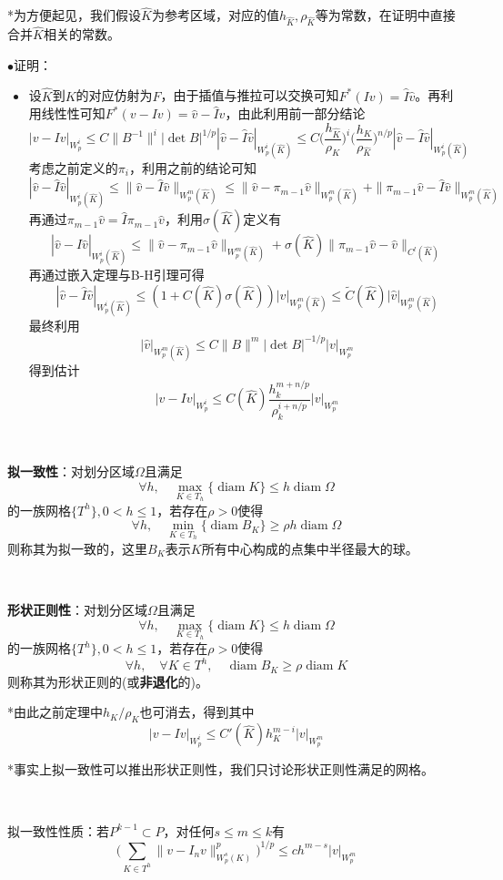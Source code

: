 \documentclass[a4paper,UTF8,fontset=windows]{ctexart}
\DeclareMathOperator*{\diam}{diam}
\newcommand{\proo}[1]{{\kaishu $\bullet$证明：
\begin{itemize}
    \item[] #1
\end{itemize}
}}
\begin{document}
*为方便起见，我们假设$\hat{K}$为参考区域，对应的值$h_{\hat{K}},\rho_{\hat{K}}$等为常数，在证明中直接合并$\hat{K}$相关的常数。

\proo{
    设$\hat{K}$到$K$的对应仿射为$F$，由于插值与推拉可以交换可知$F^*(Iv)=\hat{I}\hat{v}$。再利用线性性可知$F^*(v-Iv)=\hat{v}-\hat{I}\hat{v}$，由此利用前一部分结论
    $$|v-Iv|_{W_p^i}\le C\|B^{-1}\|^i|\det B|^{1/p}|\hat{v}-\hat{I}\hat{v}|_{W_p^i(\hat{K})}\le C\bigg(\frac{h_{\hat{K}}}{\rho_K}\bigg)^i\bigg(\frac{h_K}{\rho_{\hat{K}}}\bigg)^{n/p}|\hat{v}-\hat{I}\hat{v}|_{W_p^i(\hat{K})}$$
    考虑之前定义的$\pi_i$，利用之前的结论可知
    $$|\hat{v}-\hat{I}\hat{v}|_{W_p^i(\hat{K})}\le\|\hat{v}-\hat{I}\hat{v}\|_{W_p^m(\hat{K})}\le\|\hat{v}-\pi_{m-1}\hat{v}\|_{W_p^m(\hat{K})}+\|\pi_{m-1}\hat{v}-\hat{I}\hat{v}\|_{W_p^m(\hat{K})}$$
    再通过$\pi_{m-1}\hat{v}=\hat{I}\pi_{m-1}\hat{v}$，利用$\sigma(\hat{K})$定义有
    $$|\hat{v}-\hat{I}\hat{v}|_{W_p^i(\hat{K})}\le\|\hat{v}-\pi_{m-1}\hat{v}\|_{W_p^m(\hat{K})}+\sigma(\hat{K})\|\pi_{m-1}\hat{v}-\hat{v}\|_{C^l(\hat{K})}$$
    再通过嵌入定理与B-H引理可得
    $$|\hat{v}-\hat{I}\hat{v}|_{W_p^i(\hat{K})}\le(1+C(\hat{K})\sigma(\hat{K}))|\hat{v}|_{W_p^m(\hat{K})}\le\tilde{C}(\hat{K})|\hat{v}|_{W_p^m(\hat{K})}$$
    最终利用
    $$|\hat{v}|_{W_p^m(\hat{K})}\le C\|B\|^m|\det B|^{-1/p}|v|_{W_p^m}$$
    得到估计
    $$|v-Iv|_{W_p^i}\le C(\hat{K})\frac{h_k^{m+n/p}}{\rho_k^{i+n/p}}|v|_{W_p^m}$$
}

\

\textbf{拟一致性}：对划分区域$\Omega$且满足
$$\forall h,\quad\max_{K\in T_h}\{\diam K\}\le h\diam\Omega$$
的一族网格$\{T^h\},0<h\le1$，若存在$\rho>0$使得
$$\forall h,\quad\min_{K\in T_h}\{\diam B_K\}\ge\rho h\diam\Omega$$
则称其为拟一致的，这里$B_K$表示$K$所有中心构成的点集中半径最大的球。

\

\textbf{形状正则性}：对划分区域$\Omega$且满足
$$\forall h,\quad\max_{K\in T_h}\{\diam K\}\le h\diam\Omega$$
的一族网格$\{T^h\},0<h\le1$，若存在$\rho>0$使得
$$\forall h,\quad\forall K\in T^h,\quad\diam B_K\ge\rho\diam K$$
则称其为形状正则的(或\textbf{非退化}的)。


*由此之前定理中$h_K/\rho_K$也可消去，得到其中
$$|v-Iv|_{W_p^i}\le C'(\hat{K})h_K^{m-i}|v|_{W_p^m}$$

*事实上拟一致性可以推出形状正则性，我们只讨论形状正则性满足的网格。

\

拟一致性性质：若$P^{k-1}\subset P$，对任何$s\le m\le k$有
$$\bigg(\sum_{K\in T^h}\|v-I_nv\|^p_{W_p^s(K)}\bigg)^{1/p}\le ch^{m-s}|v|_{W_p^m}$$
\end{document}

